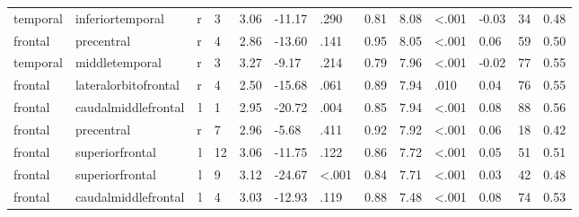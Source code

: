 \documentclass{article}
\begin{document}
\begin{longtable}{llrR{1.3cm}R{1cm}R{1.3cm}R{1cm}R{1cm}R{1.3cm}R{1cm}R{1.8cm}R{1.3cm}R{1.8cm}}
  temporal &          inferiortemporal &    r &         3 &                  3.06 &           -11.17 &               .290 &                               0.81 &                          8.08 &                   \textless.001 &  -0.03 &     34 &      0.48 \\
   frontal &                precentral &    r &         4 &                  2.86 &           -13.60 &               .141 &                               0.95 &                          8.05 &                   \textless.001 &   0.06 &     59 &      0.50 \\
  temporal &            middletemporal &    r &         3 &                  3.27 &            -9.17 &               .214 &                               0.79 &                          7.96 &                   \textless.001 &  -0.02 &     77 &      0.55 \\
   frontal &      lateralorbitofrontal &    r &         4 &                  2.50 &           -15.68 &               .061 &                               0.89 &                          7.94 &                            .010 &   0.04 &     76 &      0.55 \\
   frontal &       caudalmiddlefrontal &    l &         1 &                  2.95 &           -20.72 &               .004 &                               0.85 &                          7.94 &                   \textless.001 &   0.08 &     88 &      0.56 \\
   frontal &                precentral &    r &         7 &                  2.96 &            -5.68 &               .411 &                               0.92 &                          7.92 &                   \textless.001 &   0.06 &     18 &      0.42 \\
   frontal &           superiorfrontal &    l &        12 &                  3.06 &           -11.75 &               .122 &                               0.86 &                          7.72 &                   \textless.001 &   0.05 &     51 &      0.51 \\
   frontal &           superiorfrontal &    l &         9 &                  3.12 &           -24.67 &      \textless.001 &                               0.84 &                          7.71 &                   \textless.001 &   0.03 &     42 &      0.48 \\
   frontal &       caudalmiddlefrontal &    l &         4 &                  3.03 &           -12.93 &               .119 &                               0.88 &                          7.48 &                   \textless.001 &   0.08 &     74 &      0.53 \\

\end{longtable}
\end{document}
